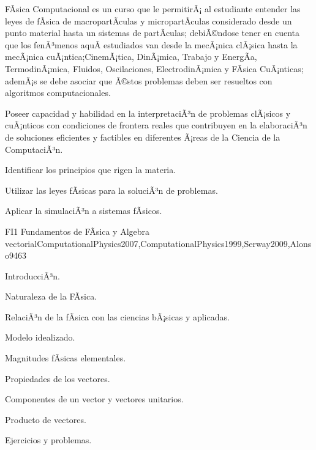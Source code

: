 \begin{syllabus}


\begin{justification}
FÃ­sica Computacional es un curso que le permitirÃ¡ al estudiante entender
las leyes de fÃ­sica de macropartÃ­culas y micropartÃ­culas considerado desde un
punto material hasta un sistemas de partÃ­culas; debiÃ©ndose tener en cuenta que los
fenÃ³menos aquÃ­ estudiados van desde la mecÃ¡nica clÃ¡sica hasta la mecÃ¡nica cuÃ¡ntica;CinemÃ¡tica, DinÃ¡mica, Trabajo y EnergÃ­a, TermodinÃ¡mica, Fluidos, Oscilaciones, ElectrodinÃ¡mica y FÃ­sica CuÃ¡nticas; 
ademÃ¡s se debe asociar que Ã©stos problemas deben ser resueltos con algoritmos computacionales.

Poseer capacidad y habilidad en la interpretaciÃ³n de problemas clÃ¡sicos y cuÃ¡nticos 
con condiciones de frontera reales que contribuyen en la elaboraciÃ³n de soluciones eficientes
y factibles en diferentes Ã¡reas de la Ciencia de la ComputaciÃ³n.
\end{justification}

\begin{goals}
\item Identificar los principios que rigen la materia.
\item Utilizar las leyes fÃ­sicas para la soluciÃ³n de problemas.
\item Aplicar la simulaciÃ³n a sistemas fÃ­sicos.
\end{goals}

\begin{outcomes}
\end{outcomes}

\begin{unit}{FI1 Fundamentos de FÃ­sica y Algebra vectorial}{ComputationalPhysics2007,ComputationalPhysics1999,Serway2009,Alonso94}{6}{3}
\begin{topics}
      \item IntroducciÃ³n.
      \item Naturaleza de la FÃ­sica.
      \item RelaciÃ³n de la fÃ­sica con las ciencias bÃ¡sicas y aplicadas.
      \item Modelo idealizado.
      \item Magnitudes fÃ­sicas  elementales.
      \item Propiedades de los vectores.
      \item Componentes de un vector y vectores unitarios.
      \item Producto de vectores.
      \item Ejercicios y problemas.
   \end{topics}


\end{unit}
\end{syllabus}
